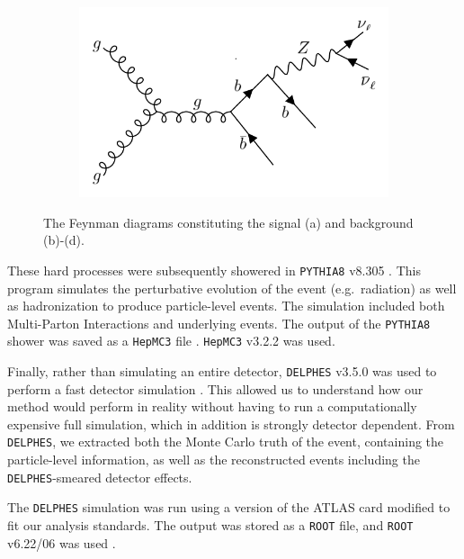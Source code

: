 \documentclass[10pt,a4paper]{book}
\def\code#1{\texttt{#1}}
\begin{document}
\begin{figure}
\begin{subfigure}{.5\textwidth}
\caption{}
\end{subfigure}
\begin{subfigure}{.5\textwidth}
\centering
\includegraphics[width=\textwidth]{ch4_images/gbb3}
\caption{}
\end{subfigure}
\caption{The Feynman diagrams constituting the signal (a) and background (b)-(d).}
\label{zhbb + gbb feynman diagrams}
\end{figure}

These hard processes were subsequently showered in \code{PYTHIA8} v8.305 \cite{Sjostrand:2014zea}. This program simulates the perturbative evolution of the event (e.g.\ radiation) as well as hadronization to produce particle-level events. The simulation included both Multi-Parton Interactions and underlying events. The output of the \code{PYTHIA8} shower was saved as a \code{HepMC3} file \cite{BUCKLEY2021107310, Dobbs:2001ck}. \code{HepMC3} v3.2.2 was used.

Finally, rather than simulating an entire detector, \code{DELPHES} v3.5.0 was used to perform a fast detector simulation \cite{Ovyn:2009tx, deFavereau:2013fsa}. This allowed us to understand how our method would perform in reality without having to run a computationally expensive full simulation, which in addition is strongly detector dependent. From \code{DELPHES}, we extracted both the Monte Carlo truth of the event, containing the particle-level information, as well as the reconstructed events including the \code{DELPHES}-smeared detector effects. 

The \code{DELPHES} simulation was run using a version of the ATLAS card modified to fit our analysis standards. The output was stored as a \code{ROOT} file, and \code{ROOT} v6.22/06 was used \cite{fons_rademakers_2020_3895852}. 
\end{document}
